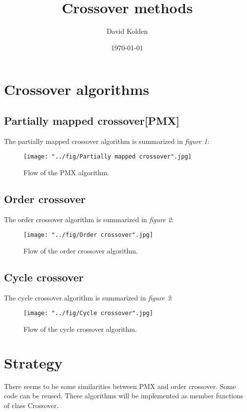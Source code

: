 \documentclass[12pt]{article}
\author{David Kolden}
\title{Crossover methods}
\date{\today}
\begin{document}
\maketitle
\tableofcontents
\newpage
\section{Crossover algorithms}
\subsection{Partially mapped crossover[PMX]}
The partially mapped crossover algorithm is summarized in \textit{figure 1}:\\
\begin{figure}[H]
\begin{center}
\texttt{[image: "../fig/Partially mapped crossover".jpg]}
\caption{Flow of the PMX algorithm.}
\end{center}
\end{figure}
\newpage
\subsection{Order crossover}
The order crossover algorithm is summarized in \textit{figure 2}:\\
\begin{figure}[H]
\begin{center}
\texttt{[image: "../fig/Order crossover".jpg]}
\caption{Flow of the order crossover algorithm.}
\end{center}
\end{figure}
\newpage
\subsection{Cycle crossover}
The cycle crossover algorithm is summarized in \textit{figure 3}:\\
\begin{figure}[H]
\begin{center}
\texttt{[image: "../fig/Cycle crossover".jpg]}
\caption{Flow of the cycle crossover algorithm.}
\end{center}
\end{figure}
\newpage
\section{Strategy}
There seems to be some similarities between PMX and order crossover. Some code can be reused. These algorithms will be implemented as member functions of class Crossover.
\end{document}
